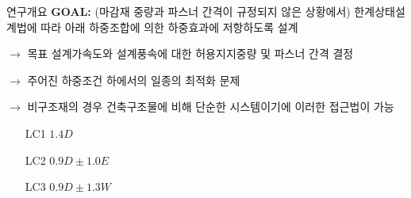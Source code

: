 \documentclass[9pt]{beamer}
\begin{document}
	\begin{frame}{연구개요}
	\textbf{GOAL:} (마감재 중량과 파스너 간격이 규정되지 않은 상황에서) 한계상태설계법에 따라 아래 하중조합에 의한 하중효과에 저항하도록 설계
	
	$\rightarrow$ 목표 설계가속도와 설계풍속에 대한 허용지지중량 및 파스너 간격 결정
	
	$\rightarrow$ 주어진 하중조건 하에서의 일종의 최적화 문제
	
	$\rightarrow$ 비구조재의 경우 건축구조물에 비해 단순한 시스템이기에 이러한 접근법이 가능 
	
\begin{itemize}
	\item[LC1] $1.4D$
	\item[LC2] $0.9D \pm 1.0E$
	\item[LC3] $0.9D \pm 1.3W$
\end{itemize}

	\end{frame}
\end{document}

